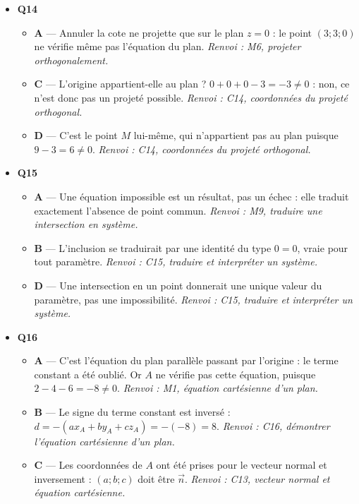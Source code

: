 \begin{itemize}
\begin{itemize}
    \item \textbf{B} — Le plan possède une infinité de directions : $\vec{u}(0;1;1)$ est orthogonal à l'axe des abscisses sans l'être au plan $z=0$. \emph{Renvoi : C10, orthogonalité d'une droite et d'un plan.}
    \item \textbf{C} — Un vecteur orthogonal au vecteur normal dirige le plan, il ne lui est pas orthogonal. \emph{Renvoi : M7, orthogonalité droite-plan.}
    \item \textbf{D} — Seul le vecteur nul est orthogonal à toutes les directions de l'espace ; un vecteur directeur est non nul. \emph{Renvoi : C10, orthogonalité d'une droite et d'un plan.}
  \end{itemize}
  \item \textbf{Q14}
  \begin{itemize}
    \item \textbf{A} — Annuler la cote ne projette que sur le plan $z=0$ : le point $(3;3;0)$ ne vérifie même pas l'équation du plan. \emph{Renvoi : M6, projeter orthogonalement.}
    \item \textbf{C} — L'origine appartient-elle au plan ? $0+0+0-3=-3\neq0$ : non, ce n'est donc pas un projeté possible. \emph{Renvoi : C14, coordonnées du projeté orthogonal.}
    \item \textbf{D} — C'est le point $M$ lui-même, qui n'appartient pas au plan puisque $9-3=6\neq0$. \emph{Renvoi : C14, coordonnées du projeté orthogonal.}
  \end{itemize}
  \item \textbf{Q15}
  \begin{itemize}
    \item \textbf{A} — Une équation impossible est un résultat, pas un échec : elle traduit exactement l'absence de point commun. \emph{Renvoi : M9, traduire une intersection en système.}
    \item \textbf{B} — L'inclusion se traduirait par une identité du type $0=0$, vraie pour tout paramètre. \emph{Renvoi : C15, traduire et interpréter un système.}
    \item \textbf{D} — Une intersection en un point donnerait une unique valeur du paramètre, pas une impossibilité. \emph{Renvoi : C15, traduire et interpréter un système.}
  \end{itemize}
  \item \textbf{Q16}
  \begin{itemize}
    \item \textbf{A} — C'est l'équation du plan parallèle passant par l'origine : le terme constant a été oublié. Or $A$ ne vérifie pas cette équation, puisque $2-4-6=-8\neq0$. \emph{Renvoi : M1, équation cartésienne d'un plan.}
    \item \textbf{B} — Le signe du terme constant est inversé : $d=-(a x_A+b y_A+c z_A)=-(-8)=8$. \emph{Renvoi : C16, démontrer l'équation cartésienne d'un plan.}
    \item \textbf{C} — Les coordonnées de $A$ ont été prises pour le vecteur normal et inversement : $(a;b;c)$ doit être $\vec{n}$. \emph{Renvoi : C13, vecteur normal et équation cartésienne.}
  \end{itemize}
\end{itemize}
\fi
